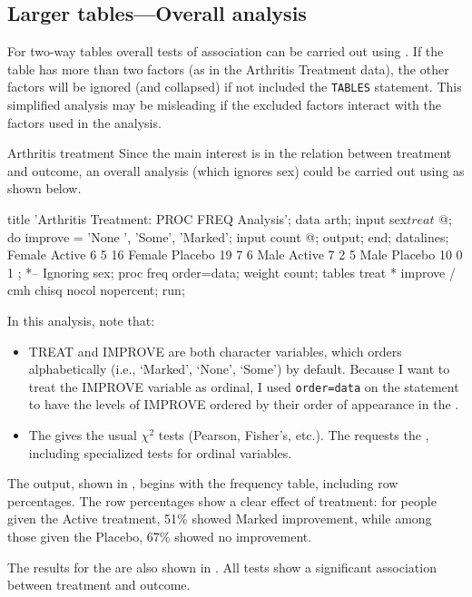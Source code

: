 \subsection{Larger tables---Overall analysis}\label{sec:twoway-overall}
For two-way tables overall tests of association can be carried out
using .
If the table has more than two factors (as in the
Arthritis Treatment data), the other factors will be
ignored (and collapsed) if not included the
\texttt{TABLES} statement.
This simplified analysis may be misleading if
the excluded factors interact with the factors used in the
analysis.

\begin{Example}[arthrit2]{Arthritis treatment}
Since the main interest is in the relation between treatment and
outcome, an overall analysis (which ignores sex) could be carried out
using  as shown below.

\begin{listing}
title 'Arthritis Treatment: PROC FREQ Analysis';
data arth;
   input sex$ treat$ @;
   do improve = 'None  ', 'Some', 'Marked';
      input count @;
      output;
      end;
datalines;
Female  Active    6  5  16
Female  Placebo  19  7   6
Male    Active    7  2   5
Male    Placebo  10  0   1
;
*-- Ignoring sex;
proc freq order=data;
   weight count;
   tables treat * improve / cmh chisq nocol nopercent;
   run;
\end{listing}

In this analysis, note that:
\begin{itemize}
\item TREAT and IMPROVE are both character variables, which 
       orders alphabetically (i.e., `Marked', `None', `Some') by
       default.  Because I want to treat the IMPROVE variable as
       ordinal, I used \texttt{order=data} on the 
       statement to have the levels of IMPROVE ordered by their order
       of appearance in the \Dset.

\item The  gives the usual \(\chi^2\) tests
       (Pearson, Fisher's, etc.).  The  requests the
       , including specialized
		 tests for ordinal variables.
\end{itemize}
The output, shown in , begins with the frequency table, including row
percentages.  The row percentages show a clear effect of treatment:
for people given the Active treatment, 51\% showed Marked improvement,
while among those given the Placebo, 67\% showed no improvement.

The results for the  are also shown in .  All tests
show a significant association between treatment and outcome.

\begin{Output}
\caption{Arthritis treatment data, overall analysis}\label{out:arthfreq.1}
\small

\end{Output}
\end{Example}

